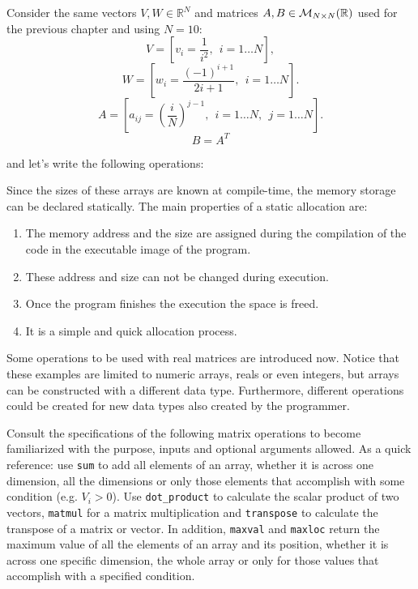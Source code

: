 Consider the same vectors $V, W \in \mathbb{R}^N$ and matrices $A, B \in { \cal{M}}_{N \times N} (\mathbb{R})$ used for the previous chapter and using $N=10$: 
$$
V = \left[ v_i =\frac{1}{i^2}, \ \ i = 1 \ldots  N \right],
$$
$$
W = \left[ w_i = \frac{(-1)^{i+1}}{2i+1}, \ \ i = 1 \ldots  N \right].
$$
$$
A = \left[ a_{ij} = \left( \frac{i}{N} \right)^{j-1}, \ \ i = 1 \ldots  N, \ \ j = 1 \ldots  N \right].
$$
$$
B = A^T
$$

and let's write the following operations:

Since the sizes of these arrays are known at compile-time, the memory storage can be declared statically. 
The main properties of a static allocation are:
\begin{enumerate}
    \item The memory address and the size are assigned during the compilation of the code in the executable image of the program.
    \item These address and size can not be changed during execution.
    \item Once the program finishes the execution the space is freed.
    \item It is a simple and quick allocation process.
\end{enumerate}


Some operations to be used with real matrices are introduced now. Notice that these examples are limited to numeric arrays, reals or even integers, but arrays can be constructed with a different data type. Furthermore, different operations could be created for new data types also created by the programmer. 
    
Consult the specifications of the following matrix operations to become familiarized with the purpose, inputs and optional arguments allowed.
As a quick reference: use \texttt{sum} to add all elements of an array, whether it is across one dimension, all the dimensions 
or only those elements that accomplish with some condition (e.g. $ V_i > 0 $). Use \texttt{dot\_product} to calculate the scalar 
product of two vectors, \texttt{matmul} for a matrix multiplication and \texttt{transpose} to calculate the transpose of a matrix or vector. 
In addition, \texttt{maxval} and \texttt{maxloc} return the maximum value of all the elements of an array and its position, whether 
it is across one specific dimension, the whole array or only for those values that accomplish with a specified condition.

